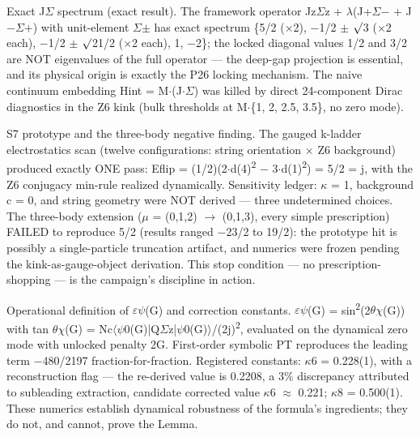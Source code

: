\documentclass[11pt,letterpaper]{article}
\begin{document}
\noindent Exact J$\Sigma$ spectrum (exact result). The framework operator Jz$\Sigma$z + $\lambda$(J+$\Sigma$$-$ + J$-$$\Sigma$+) with unit-element $\Sigma$$\pm$ has exact spectrum \{5/2 ($\times$2), $-$1/2 $\pm$ $\surd$3 ($\times$2 each), $-$1/2 $\pm$ $\surd$21/2 ($\times$2 each), 1, $-$2\}; the locked diagonal values 1/2 and 3/2 are NOT eigenvalues of the full operator --- the deep-gap projection is essential, and its physical origin is exactly the P26 locking mechanism. The naive continuum embedding Hint = M$\cdot$(J$\cdot$$\Sigma$) was killed by direct 24-component Dirac diagnostics in the Z6 kink (bulk thresholds at M$\cdot$\{1, 2, 2.5, 3.5\}, no zero mode).

\noindent S7 prototype and the three-body negative finding. The gauged k-ladder electrostatics scan (twelve configurations: string orientation $\times$ Z6 background) produced exactly ONE pass: Eflip = (1/2)(2$\cdot$d(4)\textsuperscript{2} $-$ 3$\cdot$d(1)\textsuperscript{2}) = 5/2 = j, with the Z6 conjugacy min-rule realized dynamically. Sensitivity ledger: $\kappa$ = 1, background c = 0, and string geometry were NOT derived --- three undetermined choices. The three-body extension ($\mu$ = (0,1,2) $\to$ (0,1,3), every simple prescription) FAILED to reproduce 5/2 (results ranged $-$23/2 to 19/2): the prototype hit is possibly a single-particle truncation artifact, and numerics were frozen pending the kink-as-gauge-object derivation. This stop condition --- no prescription-shopping --- is the campaign's discipline in action.

\noindent Operational definition of $\varepsilon$$\psi$(G) and correction constants. $\varepsilon$$\psi$(G) = sin\textsuperscript{2}(2$\theta$$\chi$(G)) with tan $\theta$$\chi$(G) = Nc$\langle$$\psi$0(G)|Q$\Sigma$z|$\psi$0(G)$\rangle$/(2j)\textsuperscript{2}, evaluated on the dynamical zero mode with unlocked penalty 2G. First-order symbolic PT reproduces the leading term $-$480/2197 fraction-for-fraction. Registered constants: $\kappa$6 = 0.228(1), with a reconstruction flag --- the re-derived value is 0.2208, a 3\% discrepancy attributed to subleading extraction, candidate corrected value $\kappa$6 $\approx$ 0.221; $\kappa$8 = 0.500(1). These numerics establish dynamical robustness of the formula's ingredients; they do not, and cannot, prove the Lemma.
\end{document}
